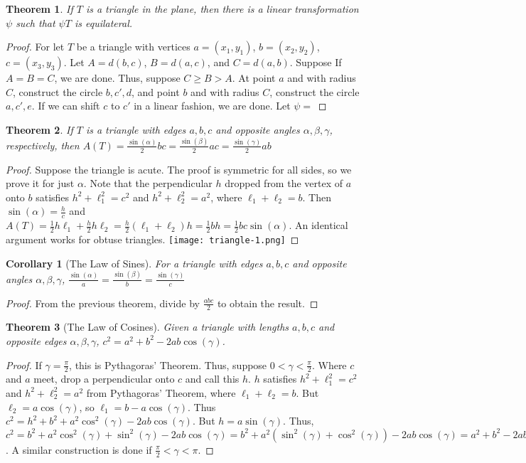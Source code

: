 \documentclass[crop=false,class=book]{standalone}
\theoremstyle{mystyle}
\newtheorem{theorem}{Theorem}[section]
\newtheorem{corollary}{Corollary}[section]
\begin{document}
\begin{theorem}
If $T$ is a triangle in the plane, then there is a linear transformation $\psi$ such that $\psi T$ is equilateral.
\end{theorem}
\begin{proof}
For let $T$ be a triangle with vertices $a=(x_1,y_1)$, $b=(x_2,y_2)$, $c=(x_3,y_3)$. Let $A = d(b,c)$, $B=d(a,c)$, and $C=d(a,b)$. Suppose If $A=B=C$, we are done. Thus, suppose $C\geq B >A$. At point $a$ and with radius $C$, construct the circle $b,c',d$, and point $b$ and with radius $C$, construct the circle $a,c',e$. If we can shift $c$ to $c'$ in a linear fashion, we are done. Let $\psi =$
\end{proof}
\begin{theorem}
If $T$ is a triangle with edges $a,b,c$ and opposite angles $\alpha,\beta,\gamma$, respectively, then $A(T) = \frac{\sin(\alpha)}{2}bc = \frac{\sin(\beta)}{2}ac = \frac{\sin(\gamma)}{2}ab$
\end{theorem}
\begin{proof}
Suppose the triangle is acute. The proof is symmetric for all sides, so we prove it for just $\alpha$. Note that the perpendicular $h$ dropped from the vertex of $a$ onto $b$ satisfies $h^2+\ell_1^2 = c^2$ and $h^2+\ell_2^2 = a^2$, where $\ell_1+\ell_2 = b$. Then $\sin(\alpha) = \frac{h}{c}$ and $A(T) = \frac{1}{2}h\ell_1 + \frac{h}{2}h\ell_2 = \frac{h}{2}(\ell_1+\ell_2)h = \frac{1}{2}bh = \frac{1}{2}bc\sin(\alpha)$. An identical argument works for obtuse triangles.
\texttt{[image: triangle-1.png]}
\end{proof}
\begin{corollary}[The Law of Sines]
For a triangle with edges $a,b,c$ and opposite angles $\alpha,\beta,\gamma$, $\frac{\sin(\alpha)}{a} = \frac{\sin(\beta)}{b} = \frac{\sin(\gamma)}{c}$
\end{corollary}
\begin{proof}
From the previous theorem, divide by $\frac{abc}{2}$ to obtain the result.
\end{proof}
\begin{theorem}[The Law of Cosines]
Given a triangle with lengths $a,b,c$ and opposite edges $\alpha,\beta,\gamma$, $c^2=a^2+b^2-2ab\cos(\gamma)$.
\end{theorem}
\begin{proof}
If $\gamma=\frac{\pi}{2}$, this is Pythagoras' Theorem. Thus, suppose $0<\gamma < \frac{\pi}{2}$. Where $c$ and $a$ meet, drop a perpendicular onto $c$ and call this $h$. $h$ satisfies $h^2+\ell_1^2 = c^2$ and $h^2+\ell_2^2=a^2$ from Pythagoras' Theorem, where $\ell_1+\ell_2 = b$. But $\ell_2 = a\cos(\gamma)$, so $\ell_1 = b-a\cos(\gamma)$. Thus $c^2 = h^2 + b^2 +a^2\cos^2(\gamma)-2ab\cos(\gamma)$. But $h = a\sin(\gamma)$. Thus, $c^2 = b^2 + a^2 \cos^2(\gamma)+\sin^2(\gamma)-2ab\cos(\gamma) = b^2 + a^2(\sin^2(\gamma)+\cos^2(\gamma))-2ab\cos(\gamma) = a^2 + b^2 -2ab\cos(\gamma)$. A similar construction is done if $\frac{\pi}{2}<\gamma < \pi$.
\end{proof}
\end{document}
